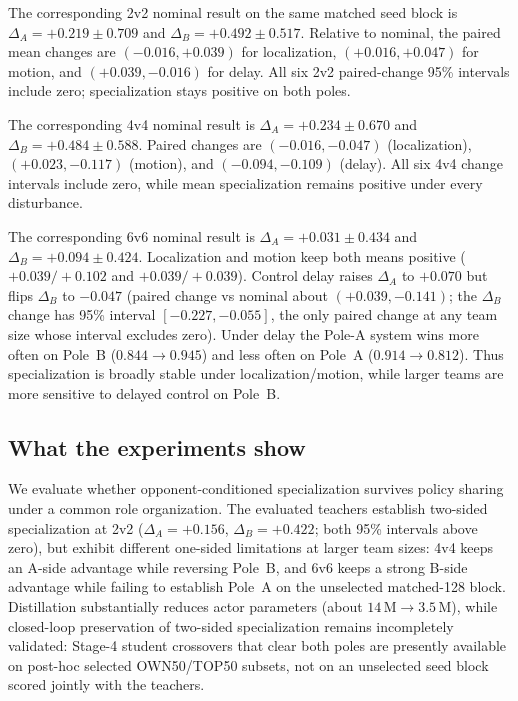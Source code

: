The corresponding 2v2 nominal result on the same matched seed block is
\(\Delta_A=+0.219 \pm 0.709\) and
\(\Delta_B=+0.492 \pm 0.517\).
Relative to nominal, the paired mean changes are
\((-0.016,+0.039)\) for localization,
\((+0.016,+0.047)\) for motion, and
\((+0.039,-0.016)\) for delay.
All six 2v2 paired-change 95\% intervals include zero; specialization stays
positive on both poles.

The corresponding 4v4 nominal result is
\(\Delta_A=+0.234 \pm 0.670\) and
\(\Delta_B=+0.484 \pm 0.588\).
Paired changes are
\((-0.016,-0.047)\) (localization),
\((+0.023,-0.117)\) (motion), and
\((-0.094,-0.109)\) (delay).
All six 4v4 change intervals include zero, while mean specialization remains
positive under every disturbance.

The corresponding 6v6 nominal result is
\(\Delta_A=+0.031 \pm 0.434\) and
\(\Delta_B=+0.094 \pm 0.424\).
Localization and motion keep both means positive
(\(+0.039/+0.102\) and \(+0.039/+0.039\)).
Control delay raises \(\Delta_A\) to \(+0.070\) but flips
\(\Delta_B\) to \(-0.047\) (paired change vs nominal about
\((+0.039,-0.141)\); the \(\Delta_B\) change has 95\% interval
\([-0.227,-0.055]\), the only paired change at any team size whose interval
excludes zero). Under delay the Pole-A system wins more often on Pole~B
(\(0.844 \to 0.945\)) and less often on Pole~A (\(0.914 \to 0.812\)).
Thus specialization is broadly stable under localization/motion, while larger
teams are more sensitive to delayed control on Pole~B.


\subsection{What the experiments show}
\label{sec:exp-takeaway}

We evaluate whether opponent-conditioned specialization survives policy
sharing under a common role organization. The evaluated teachers establish
two-sided specialization at 2v2
($\Delta_A=+0.156$, $\Delta_B=+0.422$; both 95\% intervals above zero), but
exhibit different one-sided limitations at larger team sizes: 4v4 keeps an
A-side advantage while reversing Pole~B, and 6v6 keeps a strong B-side
advantage while failing to establish Pole~A on the unselected matched-128
block. Distillation substantially reduces actor parameters
(about $14\,\mathrm{M}\to 3.5\,\mathrm{M}$), while closed-loop preservation
of two-sided specialization remains incompletely validated: Stage-4 student
crossovers that clear both poles are presently available on post-hoc
selected OWN50/TOP50 subsets, not on an unselected seed block scored jointly
with the teachers.

